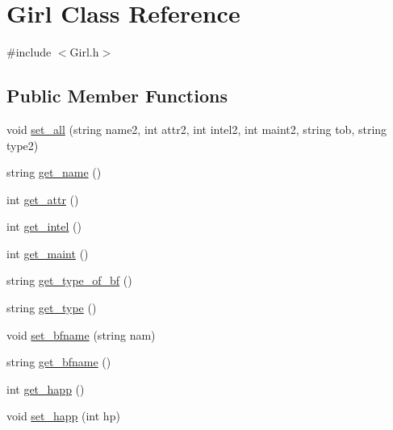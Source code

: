 \hypertarget{classGirl}{}\section{Girl Class Reference}
\label{classGirl}


{\ttfamily \#include $<$Girl.\+h$>$}

\subsection*{Public Member Functions}
\begin{DoxyCompactItemize}
\item 
void \hyperlink{classGirl_aa63d062fe13de87cccda70537d7eb91c}{set\+\_\+all} (string name2, int attr2, int intel2, int maint2, string tob, string type2)
\item 
string \hyperlink{classGirl_ae21337ca89029d6b5bbba9ff01694a2e}{get\+\_\+name} ()
\item 
int \hyperlink{classGirl_ad85944559b5d1625ca28052ed5724aad}{get\+\_\+attr} ()
\item 
int \hyperlink{classGirl_a86d5efa1b60fc9823f3e95f362f60aaa}{get\+\_\+intel} ()
\item 
int \hyperlink{classGirl_a08e38c5218b5ab4372ad44a873989774}{get\+\_\+maint} ()
\item 
string \hyperlink{classGirl_a1e1ffa542b554118319d2ced3867ed95}{get\+\_\+type\+\_\+of\+\_\+bf} ()
\item 
string \hyperlink{classGirl_a63e4086c7849a10410af9031aabf4eae}{get\+\_\+type} ()
\item 
void \hyperlink{classGirl_aec996595d3c0a9846565f334e968fd76}{set\+\_\+bfname} (string nam)
\item 
string \hyperlink{classGirl_adb8f00387cf2873521596573c6ccf40f}{get\+\_\+bfname} ()
\item 
int \hyperlink{classGirl_acd39699746a9220745e3d5c3f4586e38}{get\+\_\+happ} ()
\item 
void \hyperlink{classGirl_a6caadce0d6d58861f14bc49085629380}{set\+\_\+happ} (int hp)
\end{DoxyCompactItemize}
